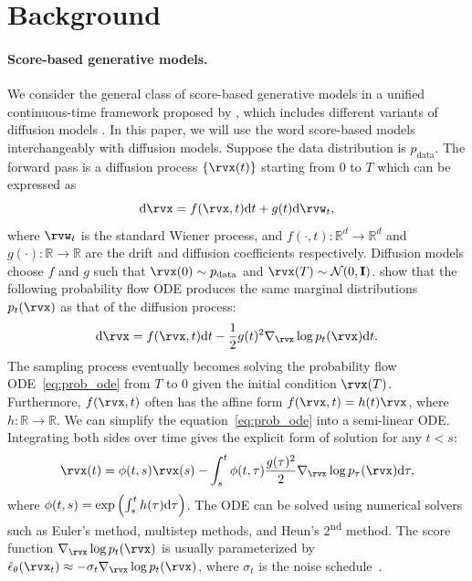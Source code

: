 \section{Background}
\paragraph{Score-based generative models.} We consider the general class of score-based generative models in a unified continuous-time framework proposed by \citet{song2020score}, which includes different variants of diffusion models \cite{sohl2015deep, ho2020denoising}. In this paper, we will use the word score-based models interchangeably with diffusion models. Suppose the data distribution is $p_{\mathrm{data}}$. The forward pass is a diffusion process $\{\rvx(t)\}$ starting from $0$ to $T$ which can be expressed as
\begin{equation}
    \df \rvx = f(\rvx, t) \df t + g(t) \df \rvw_t,
\end{equation}
where $\rvw_t$ is the standard Wiener process, and $f(\cdot,t): \mathbb{R}^d \rightarrow \mathbb{R}^d$ and $g(\cdot): \mathbb{R}\rightarrow \mathbb{R}$ are the drift and diffusion coefficients respectively. Diffusion models choose $f$ and $g$ such that $\rvx(0)\sim p_{\mathrm{data}}$ and $\rvx(T) \sim \mathcal{N}(0, \textbf{I})$. 
 \citet{song2020score} show that the following probability flow ODE produces the same marginal distributions $p_t(\rvx)$ as that of the diffusion process:
\begin{equation}
    \df \rvx = f(\rvx, t) \df t  - \frac{1}{2}g(t)^2 \nabla_{\rvx}\log p_t(\rvx) \df t.
    \label{eq:prob_ode}
\end{equation}
The sampling process eventually becomes solving the probability flow ODE~\ref{eq:prob_ode} from $T$ to $0$ given the initial condition $\rvx(T)$. Furthermore, $f(\rvx, t)$ often has the affine form $f(\rvx,t) = h(t) \rvx$, where $h: \mathbb{R} \rightarrow \mathbb{R}$. We can simplify the equation~\ref{eq:prob_ode} into a semi-linear ODE. Integrating both sides over time gives the explicit form of solution for any $t<s$:
\begin{equation}
    \rvx(t) = \phi(t, s) \rvx(s) - \int_{s}^{t} \phi(t, \tau) \frac{g(\tau)^2}{2} \nabla_{\rvx}\log p_{\tau}(\rvx) \df \tau, 
    \label{eq:ode_soln}
\end{equation}
where $\phi(t, s) = \exp\left(\int_{s}^{t} h(\tau) \mathrm{d} \tau \right)$. The ODE can be solved using numerical solvers such as Euler's method, multistep methods, and Heun's 2\textsuperscript{nd} method. 
The score function $\nabla_{\rvx} \log p_t(\rvx) $ is usually parameterized by $
    \hat{\epsilon}_{\theta}(\rvx_t) \approx - \sigma_t \nabla_{\rvx} \log p_t(\rvx)$, where $\sigma_t$ is the noise schedule~\cite{song2020score, ho2020denoising}.
    



